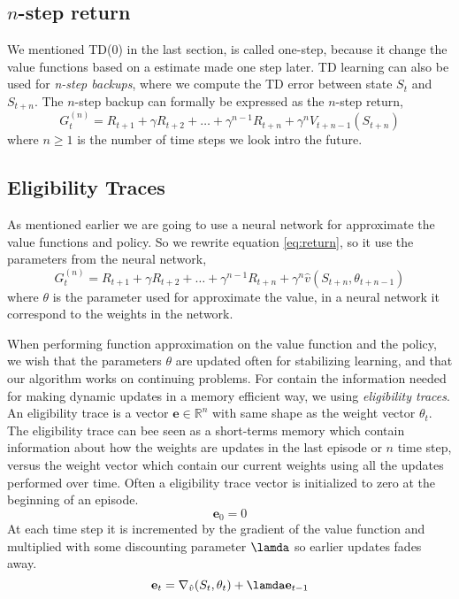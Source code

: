 \documentclass[11pt]{article}
\begin{document}
\subsection{$n$-step return}
We mentioned TD(0) in the last section, is called one-step, because it change the value functions based on a estimate made one step later. TD learning can also be used for \textit{n-step backups}, where we compute the TD error between state $S_{t}$ and $S_{t + n}$. The $n$-step backup can formally be expressed as the $n$-step return,
\begin{equation}\label{eq:return}
    G_{t}^{(n)} = R_{t + 1} + \gamma R_{t + 2} + \dots + \gamma^{n - 1} R_{t + n} + \gamma^{n} V_{t + n - 1}(S_{t + n})
\end{equation}
where $n \geq 1$ is the number of time steps we look intro the future. 

\subsection{Eligibility Traces}
As mentioned earlier we are going to use a neural network for approximate the value functions and policy. So we rewrite equation \ref{eq:return}, so it use the parameters from the neural network,
\begin{equation}
    G_{t}^{(n)} = R_{t + 1} + \gamma R_{t + 2} + \dots + \gamma^{n - 1} R_{t + n} + \gamma^{n} \hat{v}(S_{t + n}, \theta_{t + n - 1})
\end{equation}
where $\theta$ is the parameter used for approximate the value, in a neural network it correspond to the weights in the network. 

When performing function approximation on the value function and the policy, we wish that the parameters $\theta$ are updated often for stabilizing learning, and that our algorithm works on continuing problems. For contain the information needed for making dynamic updates in a memory efficient way, we using \textit{eligibility traces}. An eligibility trace is a vector $\mathbf{e} \in \mathds{R}^{n}$ with same shape as the weight vector $\theta_{t}$. The eligibility trace can bee seen as a short-terms memory which contain information about how the weights are updates in the last episode or $n$ time step, versus the weight vector which contain our current weights using all the updates performed over time. Often a eligibility trace vector is initialized to zero at the beginning of an episode.
\begin{equation}
  \mathbf{e}_{0} = 0  
\end{equation}
At each time step it is incremented by the gradient of the value function and multiplied with some discounting parameter $\lamda$ so earlier updates fades away.
\begin{equation}
  \mathbf{e}_{t} = \nabla_{\hat{v}}(S_{t}, \theta_{t}) + \lamda \mathbf{e}_{t - 1}
\end{equation}
\end{document}
